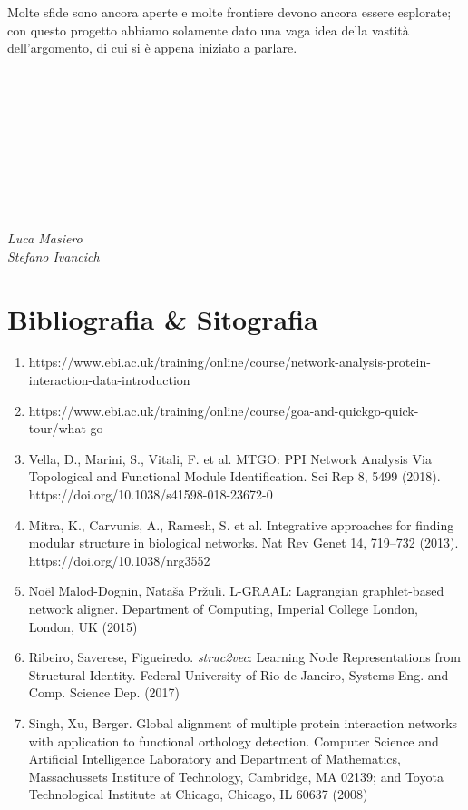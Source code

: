 \documentclass[11pt]{article}
\begin{document}
Molte sfide sono ancora aperte e molte frontiere devono ancora essere esplorate; con questo progetto abbiamo solamente dato una vaga idea della vastità dell'argomento, di cui si è appena iniziato a parlare.\\
\\
\\
\\
\\
\\
\\
\\
\\
\\
\begin{flushright}
\textit{Luca Masiero}\\
\textit{Stefano Ivancich}
\end{flushright}

\pagebreak 
\section{Bibliografia \& Sitografia} 
\begin{enumerate}
\item https://www.ebi.ac.uk/training/online/course/network-analysis-protein-interaction-data-introduction

\item https://www.ebi.ac.uk/training/online/course/goa-and-quickgo-quick-tour/what-go

\item Vella, D., Marini, S., Vitali, F. et al. MTGO: PPI Network Analysis Via Topological and Functional Module Identification. Sci Rep 8, 5499 (2018). https://doi.org/10.1038/s41598-018-23672-0

\item Mitra, K., Carvunis, A., Ramesh, S. et al. Integrative approaches for finding modular structure in biological networks. Nat Rev Genet 14, 719–732 (2013). https://doi.org/10.1038/nrg3552

\item No\"el Malod-Dognin, Nata\v{s}a Pr\v{z}uli. L-GRAAL: Lagrangian graphlet-based network aligner. Department of Computing, Imperial College London, London, UK (2015)

\item Ribeiro, Saverese, Figueiredo. \textit{struc2vec}: Learning Node Representations from Structural Identity. Federal University of Rio de Janeiro, Systems Eng. and Comp. Science Dep. (2017)

\item Singh, Xu, Berger. Global alignment of multiple protein interaction networks with application to functional orthology detection. Computer Science and Artificial Intelligence Laboratory and Department of Mathematics, Massachussets Institure of Technology, Cambridge, MA 02139; and Toyota Technological Institute at Chicago, Chicago, IL 60637 (2008)

\end{enumerate}
\end{document}
